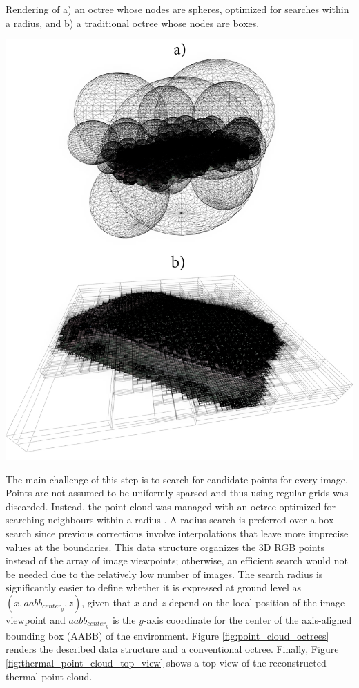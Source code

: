 \begin{marginfigure}[.0cm]
	\caption{Rendering of a) an octree whose nodes are spheres, optimized for searches within a radius, and b) a traditional octree whose nodes are boxes. }
	\label{fig:point_cloud_octrees}
	\includegraphics{figs/thermal_projection/octrees.png}
\end{marginfigure}
The main challenge of this step is to search for candidate points for every image. Points are not assumed to be uniformly sparsed and thus using regular grids was discarded. Instead, the point cloud was managed with an octree optimized for searching neighbours within a radius \cite{behley_efficient_2015}. A radius search is preferred over a box search since previous corrections involve interpolations that leave more imprecise values at the boundaries. This data structure organizes the 3D RGB points instead of the array of image viewpoints; otherwise, an efficient search would not be needed due to the relatively low number of images. The search radius is significantly easier to define whether it is expressed at ground level as $(x, aabb_{\textit{center}_{y}}, z)$, given that $x$ and $z$ depend on the local position of the image viewpoint and $aabb_{\textit{center}_{y}}$ is the $y$-axis coordinate for the center of the axis-aligned bounding box (AABB) of the environment. Figure \ref{fig:point_cloud_octrees} renders the described data structure and a conventional octree. Finally, Figure \ref{fig:thermal_point_cloud_top_view} shows a top view of the reconstructed thermal point cloud.

